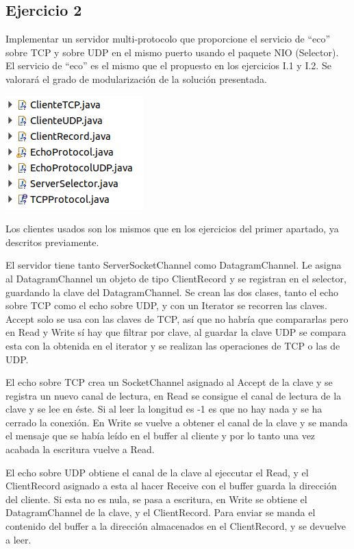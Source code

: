 \documentclass{article}
\begin{document}
\subsection{Ejercicio 2}

Implementar un servidor multi-protocolo que proporcione el servicio de “eco” sobre TCP y
sobre UDP en el mismo puerto usando el paquete NIO (Selector). El servicio de “eco” es el
mismo que el propuesto en los ejercicios I.1 y I.2. Se valorará el grado de modularización de
la solución presentada.

\begin{center}
\includegraphics[scale=0.5]{images/III2.png}
\end{center}

Los clientes usados son los mismos que en los ejercicios del primer apartado, ya descritos previamente.

El servidor tiene tanto ServerSocketChannel como DatagramChannel. Le asigna al DatagramChannel un objeto de tipo ClientRecord y se registran en el selector, guardando la clave del DatagramChannel. Se crean las dos clases, tanto el echo sobre TCP como el echo sobre UDP, y con un Iterator se recorren las claves. Accept solo se usa con las claves de TCP, así que no habría que compararlas pero en Read y Write sí hay que filtrar por clave, al
guardar la clave UDP se compara esta con la obtenida en el iterator y se realizan las
operaciones de TCP o las de UDP.

El echo sobre TCP crea un SocketChannel asignado al Accept de la clave y se
registra un nuevo canal de lectura, en Read se consigue el canal de lectura de la clave y se lee en éste. Si al leer la longitud es -1 es que no hay nada y se ha cerrado la conexión. En Write se vuelve a obtener el canal de la clave y se manda el mensaje que se había leído en el buffer al cliente y por lo tanto una vez acabada la escritura vuelve a Read.

El echo sobre UDP obtiene el canal de la clave al ejeccutar el Read, y el ClientRecord asignado a esta al hacer Receive con el buffer guarda la dirección del cliente. Si esta no es
nula, se pasa a escritura, en Write se obtiene el DatagramChannel de la clave, y el
ClientRecord. Para enviar se manda el contenido del buffer a la dirección almacenados en el
ClientRecord, y se devuelve a leer.
\end{document}

